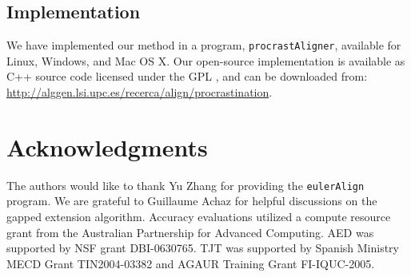 \documentclass{llncs}
\begin{document}
\subsection{Implementation}
We have implemented our method in a program, \texttt{procrastAligner},
available for Linux, Windows, and Mac OS X. Our open-source
implementation is available as C++ source code licensed under the GPL , and can be downloaded from: \\
\url{http://alggen.lsi.upc.es/recerca/align/procrastination}.

\section{ Acknowledgments }
The authors would like to thank Yu Zhang for providing the
\texttt{eulerAlign} program. We are grateful to Guillaume Achaz for
helpful discussions on the gapped extension algorithm. Accuracy
evaluations utilized a compute resource grant from the Australian
Partnership for Advanced Computing.  AED was supported by NSF grant
DBI-0630765. TJT was supported by Spanish Ministry MECD Grant
TIN2004-03382 and AGAUR Training Grant FI-IQUC-2005.




%
\end{document}
